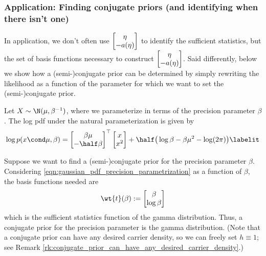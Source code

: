 \subsubsection{Application: Finding conjugate priors (and identifying when there isn't one)}

In application, we don't often use $\begin{bmatrix} 
\eta \\
-a(\eta)
\end{bmatrix}$ to identify the sufficient statistics, but the set of basis functions necessary to construct $\begin{bmatrix} 
\eta \\
-a(\eta)
\end{bmatrix}$. Said differently, below we show how a (semi-)conjugate prior can be determined by simply rewriting the likelihood as a function of the parameter for which we want to set the (semi-)conjugate prior.  

\begin{example}
Let $X \sim \N(\mu, \beta^{-1})$, where we parameterize in terms of the precision parameter $\beta$.  The log pdf under the natural parameterization is given by 
\begin{align*} 
\log p(x \cond \mu, \beta) = 
\begin{bmatrix} 
\beta \mu \\
-\half \beta
\end{bmatrix}^\top 
\begin{bmatrix} 
x \\
x^2
\end{bmatrix} 
+ \half \big(\log \beta - \beta \mu^2 - \log (2 \pi) \big)	
\labelit \label{eqn:gaussian_pdf_precision_parametrization}
\end{align*}

Suppose we want to find a (semi-)conjugate prior for the precision parameter $\beta$.  Considering \eqref{eqn:gaussian_pdf_precision_parametrization} as a function of $\beta$, the basis functions needed are
\[ \wt{t}(\beta) := 
\begin{bmatrix} 
\beta \\
\log \beta
\end{bmatrix} 
  \]
 which is the sufficient statistics function of the gamma distribution.  Thus, a conjugate prior for the precision parameter is the gamma distribution. (Note that a conjugate prior can have any desired carrier density, so we can freely set $h \equiv 1$; see Remark \ref{rk:conjugate_prior_can_have_any_desired_carrier_density}.)
\end{example}


